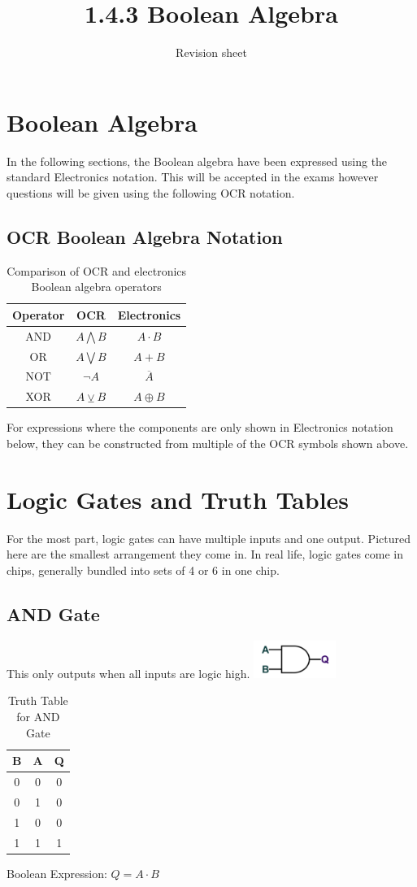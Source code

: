 \documentclass[a4paper,11pt, twocolumn]{article}
\title{1.4.3 Boolean Algebra}
\author{Revision sheet}
\date{}
\begin{document}
\maketitle
\thispagestyle{fancy}

\section{Boolean Algebra}
In the following sections, the Boolean algebra have been expressed using the standard Electronics notation. This will be accepted in the exams however questions will be given using the following OCR notation.
\subsection{OCR Boolean Algebra Notation}
\begin{table}[H]
    \centering
    \begin{tabular}{c | c c }
        Operator & OCR & Electronics \\
        \hline
        AND & $A \bigwedge B$ & $A \cdot B$ \\
        OR  & $A \bigvee B$ & $A + B$ \\
        NOT & $\neg A$ & $\overline{A}$ \\
        XOR & $A \veebar B$ & $A \oplus B$
    \end{tabular}
    \caption{Comparison of OCR and electronics Boolean algebra operators}
    \label{tab:ocrVsEle}
\end{table}
\noindent For expressions where the components are only shown in Electronics notation below, they can be constructed from multiple of the OCR symbols shown above.

\section{Logic Gates and Truth Tables}
For the most part, logic gates can have multiple inputs and one output. Pictured here are the smallest arrangement they come in. In real life, logic gates come in chips, generally bundled into sets of 4 or 6 in one chip.
\subsection{AND Gate}
This only outputs when all inputs are logic high.
\includegraphics[width=0.2\textwidth]{andGate.PNG}
\begin{table}[H]
    \centering
    \begin{tabularx}{0.127\textwidth}{c|c|c}
    B & A & Q \\
    \hline
    0 & 0 & 0 \\
    0 & 1 & 0 \\
    1 & 0 & 0 \\
    1 & 1 & 1
    \end{tabularx}
    \caption{Truth Table for AND Gate}
\end{table}
Boolean Expression: $Q=A \cdot B$
\end{document}

